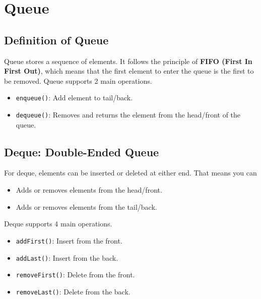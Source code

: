 \documentclass[letterpaper,12pt]{article}
\begin{document}
\section{Queue}
\subsection{Definition of Queue}
Queue stores a sequence of elements. It follows the principle of \textbf{FIFO (First In First Out)}, which means that the first element to enter the queue is the first to be removed. Queue supports 2 main operations.
\begin{itemize}
    \item \texttt{enqueue()}: Add element to tail/back.
    \item \texttt{dequeue()}: Removes and returns the element from the head/front of the queue.
\end{itemize}

\subsection{Deque: Double-Ended Queue}
For deque, elements can be inserted or deleted at either end. That means you can
\begin{itemize}
    \item Adds or removes elements from the head/front.
    \item Adds or removes elements from the tail/back.
\end{itemize}
Deque supports 4 main operations.
\begin{itemize}
    \item \texttt{addFirst()}: Insert from the front.
    \item \texttt{addLast()}: Insert from the back.
    \item \texttt{removeFirst()}: Delete from the front.
    \item \texttt{removeLast()}: Delete from the back.
\end{itemize}
\end{document}
